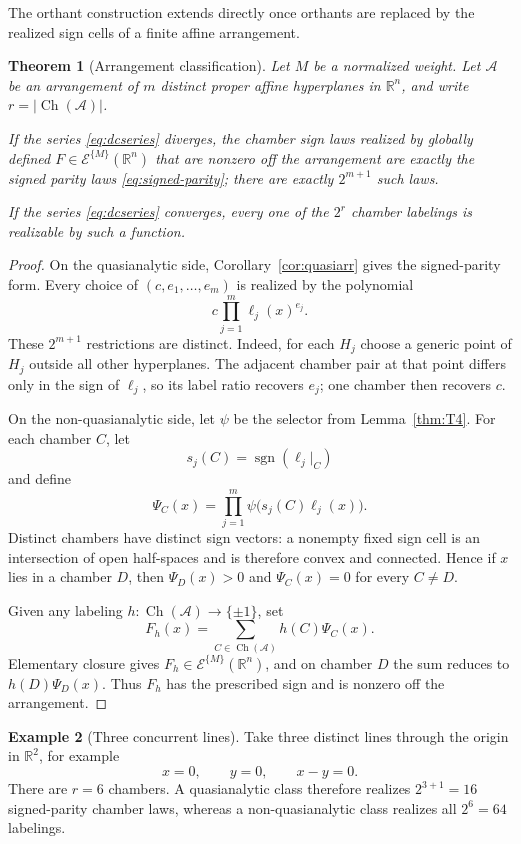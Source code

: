 \documentclass[11pt]{article}
\newtheorem{theorem}{Theorem}[section]
\theoremstyle{definition}
\newtheorem{example}[theorem]{Example}
\theoremstyle{remark}
\newcommand{\R}{\mathbb{R}}
\newcommand{\sign}{\operatorname{sgn}}
\newcommand{\Ch}{\operatorname{Ch}}
\newcommand{\cA}{\mathcal{A}}
\begin{document}
The orthant construction extends directly once orthants are replaced by the realized sign cells of a finite affine arrangement.

\begin{theorem}[Arrangement classification]\label{thm:T6}
Let $M$ be a normalized weight. Let $\cA$ be an arrangement of $m$ distinct proper affine hyperplanes in $\R^n$, and write $r=|\Ch(\cA)|$.

If the series \eqref{eq:dcseries} diverges, the chamber sign laws realized by globally defined $F\in\mathcal{E}^{\{M\}}(\R^n)$ that are nonzero off the arrangement are exactly the signed parity laws \eqref{eq:signed-parity}; there are exactly $2^{m+1}$ such laws.

If the series \eqref{eq:dcseries} converges, every one of the $2^r$ chamber labelings is realizable by such a function.
\end{theorem}

\begin{proof}
On the quasianalytic side, Corollary~\ref{cor:quasiarr} gives the signed-parity form. Every choice of $(c,e_1,\dots,e_m)$ is realized by the polynomial
\[
 c\prod_{j=1}^m\ell_j(x)^{e_j}.
\]
These $2^{m+1}$ restrictions are distinct. Indeed, for each $H_j$ choose a generic point of $H_j$ outside all other hyperplanes. The adjacent chamber pair at that point differs only in the sign of $\ell_j$, so its label ratio recovers $e_j$; one chamber then recovers $c$.

On the non-quasianalytic side, let $\psi$ be the selector from Lemma~\ref{thm:T4}. For each chamber $C$, let
\[
 s_j(C)=\sign(\ell_j|_C)
\]
and define
\[
 \Psi_C(x)=\prod_{j=1}^m\psi\bigl(s_j(C)\ell_j(x)\bigr).
\]
Distinct chambers have distinct sign vectors: a nonempty fixed sign cell is an intersection of open half-spaces and is therefore convex and connected. Hence if $x$ lies in a chamber $D$, then $\Psi_D(x)>0$ and $\Psi_C(x)=0$ for every $C\ne D$.

Given any labeling $h:\Ch(\cA)\to\{\pm1\}$, set
\[
 F_h(x)=\sum_{C\in\Ch(\cA)} h(C)\Psi_C(x).
\]
Elementary closure gives $F_h\in\mathcal{E}^{\{M\}}(\R^n)$, and on chamber $D$ the sum reduces to $h(D)\Psi_D(x)$. Thus $F_h$ has the prescribed sign and is nonzero off the arrangement.
\end{proof}

\begin{example}[Three concurrent lines]
Take three distinct lines through the origin in $\R^2$, for example
\[
 x=0,\qquad y=0,\qquad x-y=0.
\]
There are $r=6$ chambers. A quasianalytic class therefore realizes $2^{3+1}=16$ signed-parity chamber laws, whereas a non-quasianalytic class realizes all $2^6=64$ labelings.
\end{example}
\end{document}

